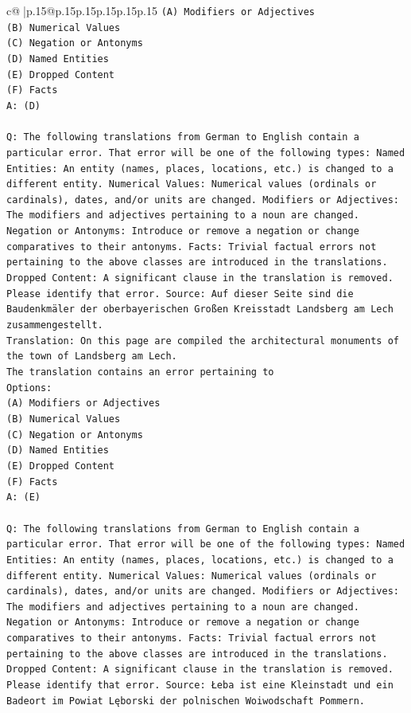 \documentclass{article}
\begin{document}
{\begin{supertabular}{c@{$\;$}|p{.15\linewidth}@{}p{.15\linewidth}p{.15\linewidth}p{.15\linewidth}p{.15\linewidth}p{.15\linewidth}}
{{{\texttt{(A) Modifiers or Adjectives} \\
\texttt{(B) Numerical Values} \\
\texttt{(C) Negation or Antonyms} \\
\texttt{(D) Named Entities} \\
\texttt{(E) Dropped Content} \\
\texttt{(F) Facts} \\
\texttt{A: (D)} \\
\\ 
\texttt{Q: The following translations from German to English contain a particular error. That error will be one of the following types: Named Entities: An entity (names, places, locations, etc.) is changed to a different entity. Numerical Values: Numerical values (ordinals or cardinals), dates, and/or units are changed. Modifiers or Adjectives: The modifiers and adjectives pertaining to a noun are changed. Negation or Antonyms: Introduce or remove a negation or change comparatives to their antonyms. Facts: Trivial factual errors not pertaining to the above classes are introduced in the translations. Dropped Content: A significant clause in the translation is removed. Please identify that error.  Source: Auf dieser Seite sind die Baudenkmäler der oberbayerischen Großen Kreisstadt Landsberg am Lech zusammengestellt.} \\
\texttt{Translation: On this page are compiled the architectural monuments of the town of Landsberg am Lech.} \\
\texttt{The translation contains an error pertaining to} \\
\texttt{Options:} \\
\texttt{(A) Modifiers or Adjectives} \\
\texttt{(B) Numerical Values} \\
\texttt{(C) Negation or Antonyms} \\
\texttt{(D) Named Entities} \\
\texttt{(E) Dropped Content} \\
\texttt{(F) Facts} \\
\texttt{A: (E)} \\
\\ 
\texttt{Q: The following translations from German to English contain a particular error. That error will be one of the following types: Named Entities: An entity (names, places, locations, etc.) is changed to a different entity. Numerical Values: Numerical values (ordinals or cardinals), dates, and/or units are changed. Modifiers or Adjectives: The modifiers and adjectives pertaining to a noun are changed. Negation or Antonyms: Introduce or remove a negation or change comparatives to their antonyms. Facts: Trivial factual errors not pertaining to the above classes are introduced in the translations. Dropped Content: A significant clause in the translation is removed. Please identify that error.  Source: Łeba ist eine Kleinstadt und ein Badeort im Powiat Lęborski der polnischen Woiwodschaft Pommern.} \\
}}}
\end{supertabular}}
\end{document}
